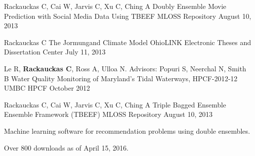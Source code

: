 \begin{cventries}
	
	\cventry
	{Rackauckas C, Cai W, Jarvis C, Xu C, Ching A} %
	{Doubly Ensemble Movie Prediction with Social Media Data Using TBEEF} %
	{MLOSS Repository} %
	{August 10, 2013} %
	{}
	
	\cventry
	{Rackauckas C} %
	{The Jormungand Climate Model} %
	{OhioLINK Electronic Theses and Dissertation Center} %
	{July 11, 2013} %
	{}
	
		
	\cventry
	{Le R, {\bf Rackauckas C}, Ross A, Ulloa N. Advisors: Popuri S, Neerchal N, Smith B} %
	{Water Quality Monitoring of Maryland’s Tidal Waterways, HPCF-2012-12} %
	{UMBC HPCF} %
	{October 2012} %
	{}
	
\end{cventries}



\begin{cventries}
	
	\cventry
	{Rackauckas C, Cai W, Jarvis C, Xu C, Ching A} %
	{Triple Bagged Ensemble Ensemble Framework (TBEEF)} %
	{MLOSS Repository} %
	{August 10, 2013} %
	{\begin{cvitems}
		\item Machine learning software for recommendation problems using double ensembles.
		\item Over 800 downloads as of April 15, 2016.
	\end{cvitems}}
	
\end{cventries}